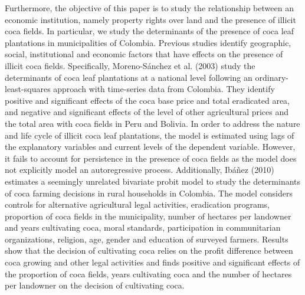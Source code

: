 \documentclass[12pt,a4paper,english]{article}%
\begin{document}
Furthermore, the objective of this paper is to study the relationship between an economic institution, namely property rights over land and the presence of illicit coca fields. In particular, we study the determinants of the presence of coca leaf plantations in municipalities of Colombia. Previous studies identify geographic, social, institutional and economic factors that have effects on the presence of illicit coca fields. Specifically, Moreno-S\'{a}nchez et al. (2003) study the determinants of coca leaf plantations at a national level following an ordinary-least-squares approach with time-series data from Colombia. They identify positive and significant effects of the coca base price and total eradicated area, and negative and significant effects of the level of other agricultural prices and the total area with coca fields in Peru and Bolivia. In order to address the nature and life cycle of illicit coca leaf plantations, the model is estimated using lags of the explanatory variables and current levels of the dependent variable. However, it fails to account for persistence in the presence of coca fields as the model does not explicitly model an autoregressive process. Additionally, Ib\'{a}\~{n}ez (2010) estimates a seemingly unrelated bivariate probit model to study the determinants of coca farming decisions in rural households in Colombia. The model considers controls for alternative agricultural legal activities, eradication programs, proportion of coca fields in the municipality, number of hectares per landowner and years cultivating coca, moral standards, participation in communitarian organizations, religion, age, gender and education of surveyed farmers. Results show that the decision of cultivating coca relies on the profit difference between coca growing and other legal activities and finds positive and significant effects of the proportion of coca fields, years cultivating coca and the number of hectares per landowner on the decision of cultivating coca.
\end{document}

